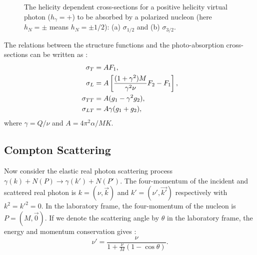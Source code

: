 \begin{figure}[tb!]
\begin{subfigure}[t]{0.4\textwidth}
    \subcaption{{} \label{C2S4SS1F1B}}
  \end{subfigure}
  \caption[Schematic of the helicity dependent cross-sections $\sigma_{1/2}$ and $\sigma_{3/2}$.]{The helicity dependent cross-sections for a positive helicity virtual photon ($h_\gamma=+$) to be absorbed by a polarized nucleon (here $h_N=\pm$ means $h_N=\pm 1/2$): (a) $\sigma_{1/2}$ and (b) $\sigma_{3/2}$. \label{C2S4SS1F1}}
\end{figure}

The relations between the structure functions and the photo-absorption cross-sections can be written as \cite{Thomas2001,Drechsel2003}:
\begin{align} \label{C2S4SS1E6}
\sigma_T & = AF_1, \\ \label{C2S4SS1E7}
\sigma_L & = A\left[\frac{(1+\gamma^2)M}{\gamma^2\nu}F_2-F_1\right], \\ \label{C2S4SS1E8}
\sigma_{TT} & = A(g_1-\gamma^2g_2), \\ \label{C2S4SS1E9}
\sigma_{LT} & = A\gamma(g_1+g_2),
\end{align}
where $\gamma=Q/\nu$ and $A=4\pi^2\alpha/MK$.

\subsection{Compton Scattering}
\label{C2S4SS2}

Now consider the elastic real photon scattering process $\gamma(k)+N(P)\rightarrow\gamma(k')+N(P')$. The four-momentum of the incident and scattered real photon is $k=(\nu,\vec{k})$ and $k'=(\nu',\vec{k'})$ respectively with $k^2=k'^2=0$. In the laboratory frame, the four-momentum of the nucleon is $P=(M,\vec{0})$. If we denote the scattering angle by $\theta$ in the laboratory frame, the energy and momentum conservation gives \cite{Thomas2001}:
\begin{equation} \label{C2S4SS2E1}
\nu' = \frac{\nu}{1+\frac{\nu}{M}(1-\cos\theta)}.
\end{equation}

